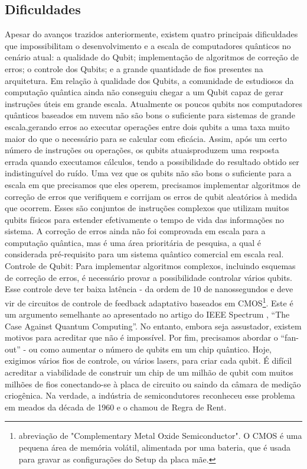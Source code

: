 \subsection{Dificuldades}
Apesar do avanços trazidos anteriormente, existem quatro principais dificuldades que impossibilitam o desenvolvimento e a escala de computadores quânticos no cenário atual: a qualidade do Qubit; implementação de algoritmos de correção de erros; o controle dos Qubits; e a grande quantidade de fios presentes na arquitetura.
Em relação à qualidade dos Qubits, a comunidade de estudiosos da computação quântica ainda não conseguiu chegar a um Qubit capaz de gerar instruções úteis em grande escala. Atualmente os poucos qubits nos computadores quânticos baseados em nuvem não são bons o suficiente para sistemas de grande escala,gerando erros ao executar operações entre dois qubits a uma taxa muito maior do que o necessário para se calcular com eficácia. Assim, após um certo número de instruções ou operações, os qubits atuaisproduzem uma resposta errada quando executamos cálculos, tendo a possibilidade do resultado obtido  ser indistinguível do ruído.
Uma vez que os qubits não são bons o suficiente para a escala em que precisamos que eles operem, precisamos implementar algoritmos de correção de erros que verifiquem e corrijam os erros de qubit aleatórios à medida que ocorrem. Esses são conjuntos de instruções complexos que utilizam muitos qubits físicos para estender efetivamente o tempo de vida das informações no sistema. A correção de erros ainda não foi comprovada em escala para a computação quântica, mas é uma área prioritária de pesquisa, a qual é considerada pré-requisito para um sistema quântico comercial em escala real.
Controle de Qubit: Para implementar algoritmos complexos, incluindo esquemas de correção de erros, é necessário provar a possibilidade controlar vários qubits. Esse controle deve ter baixa latência - da ordem de 10 de nanossegundos e deve vir de circuitos de controle de feedback adaptativo baseados em CMOS\footnote{abreviação de "Complementary Metal Oxide Semiconductor". O CMOS é uma pequena área de memória volátil, alimentada por uma bateria, que é usada para gravar as configurações do Setup da placa mãe.}. Este é um argumento semelhante ao apresentado no artigo do IEEE Spectrum , ``The Case Against Quantum Computing''. No entanto, embora seja assustador, existem motivos para acreditar que não é impossível.
Por fim, precisamos abordar o “fan-out” - ou como aumentar o número de qubits em um chip quântico. Hoje, exigimos vários fios de controle, ou vários lasers, para criar cada qubit. É difícil acreditar a viabilidade de construir um chip de um milhão de qubit com muitos milhões de fios conectando-se à placa de circuito ou saindo da câmara de medição criogênica. Na verdade, a indústria de semicondutores reconheceu esse problema em meados da década de 1960 e o chamou de Regra de Rent.

